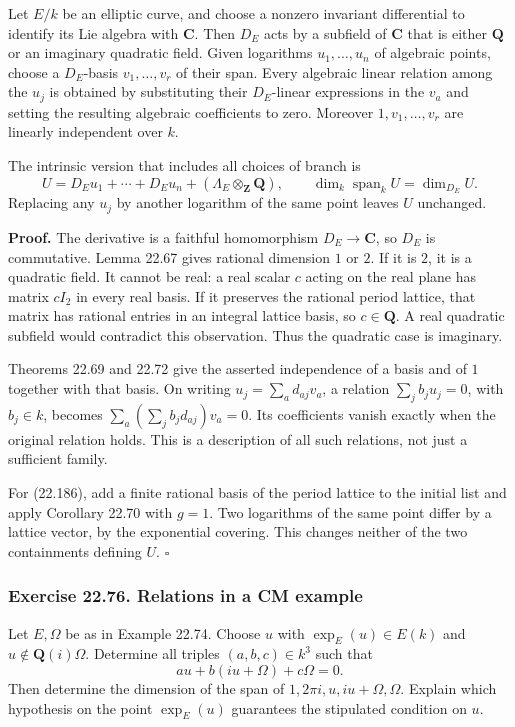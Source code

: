 \documentclass[
  11pt,
  a4paper,
]{article}
\begin{document}
Let \(E/k\) be an elliptic curve, and choose a nonzero invariant
differential to identify its Lie algebra with \(\mathbf C\). Then
\(D_E\) acts by a subfield of \(\mathbf C\) that is either \(\mathbf Q\)
or an imaginary quadratic field. Given logarithms \(u_1,\ldots,u_n\) of
algebraic points, choose a \(D_E\)-basis \(v_1,\ldots,v_r\) of their
span. Every algebraic linear relation among the \(u_j\) is obtained by
substituting their \(D_E\)-linear expressions in the \(v_a\) and setting
the resulting algebraic coefficients to zero. Moreover
\(1,v_1,\ldots,v_r\) are linearly independent over \(k\).

The intrinsic version that includes all choices of branch is \[
 U=D_Eu_1+\cdots+D_Eu_n+(\Lambda_E\otimes_{\mathbf Z}\mathbf Q),
 \qquad
 \dim_k\operatorname{span}_k U=\dim_{D_E}U.
 \tag{22.186}
\] Replacing any \(u_j\) by another logarithm of the same point leaves
\(U\) unchanged.

\textbf{Proof.} The derivative is a faithful homomorphism
\(D_E\to\mathbf C\), so \(D_E\) is commutative. Lemma 22.67 gives
rational dimension \(1\) or \(2\). If it is \(2\), it is a quadratic
field. It cannot be real: a real scalar \(c\) acting on the real plane
has matrix \(cI_2\) in every real basis. If it preserves the rational
period lattice, that matrix has rational entries in an integral lattice
basis, so \(c\in\mathbf Q\). A real quadratic subfield would contradict
this observation. Thus the quadratic case is imaginary.

Theorems 22.69 and 22.72 give the asserted independence of a basis and
of \(1\) together with that basis. On writing \(u_j=\sum_a d_{aj}v_a\),
a relation \(\sum_j b_j u_j=0\), with \(b_j\in k\), becomes
\(\sum_a(\sum_j b_jd_{aj})v_a=0\). Its coefficients vanish exactly when
the original relation holds. This is a description of all such
relations, not just a sufficient family.

For (22.186), add a finite rational basis of the period lattice to the
initial list and apply Corollary 22.70 with \(g=1\). Two logarithms of
the same point differ by a lattice vector, by the exponential covering.
This changes neither of the two containments defining \(U\). \(\square\)

\subsubsection{Exercise 22.76. Relations in a CM
example}\label{exercise-22.76.-relations-in-a-cm-example}

Let \(E,\Omega\) be as in Example 22.74. Choose \(u\) with
\(\exp_E(u)\in E(k)\) and \(u\notin\mathbf Q(i)\Omega\). Determine all
triples \((a,b,c)\in k^3\) such that \[
 a u+b(iu+\Omega)+c\Omega=0.
 \tag{22.187}
\] Then determine the dimension of the span of
\(1,2\pi i,u,iu+\Omega,\Omega\). Explain which hypothesis on the point
\(\exp_E(u)\) guarantees the stipulated condition on \(u\).
\end{document}
